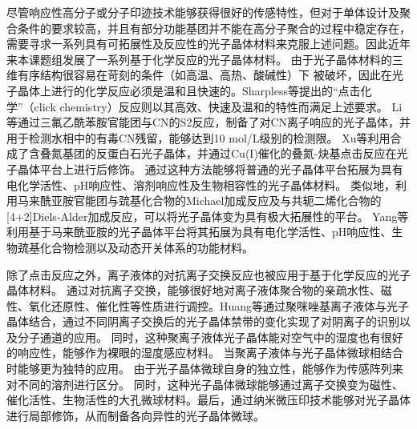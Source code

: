 尽管响应性高分子或分子印迹技术能够获得很好的传感特性，但对于单体设计及聚合条件的要求较高，并且有部分功能基团并不能在高分子聚合的过程中稳定存在，需要寻求一系列具有可拓展性及反应性的光子晶体材料来克服上述问题。因此近年来本课题组发展了一系列基于化学反应的光子晶体材料。
由于光子晶体材料的三维有序结构很容易在苛刻的条件（如高温、高热、酸碱性）下
被破坏，因此在光子晶体上进行的化学反应必须是温和且快速的。Sharpless等提出的“点击化学”（click chemistry）反应\cite{Kolb2001Click}则以其高效、快速及温和的特性而满足上述要求。
Li等通过三氟乙酰苯胺官能团与CN\text{$^-$}的S2反应，制备了对CN\text{$^-$}离子响应的光子晶体，并用于检测水相中的有毒CN\text{$^-$}残留，能够达到10 mol/L级别的检测限\cite{Li2012Reactive}。
Xu等利用合成了含叠氮基团的反蛋白石光子晶体，并通过Cu(I)催化的叠氮-炔基点击反应在光子晶体平台上进行后修饰\cite{Xu2012Clickable}。
通过这种方法能够将普通的光子晶体平台拓展为具有电化学活性、pH响应性、溶剂响应性及生物相容性的光子晶体材料。
类似地，利用马来酰亚胺官能团与巯基化合物的Michael加成反应及与共轭二烯化合物的[4+2]Diels-Alder加成反应，可以将光子晶体变为具有极大拓展性的平台。
Yang等利用基于马来酰亚胺的光子晶体平台将其拓展为具有电化学活性、pH响应性、生物巯基化合物检测以及动态开关体系的功能材料\cite{Yang2013MaleimideContaining}。

除了点击反应之外，离子液体的对抗离子交换反应也被应用于基于化学反应的光子晶体材料。
通过对抗离子交换，能够很好地对离子液体聚合物的亲疏水性、磁性、氧化还原性、催化性等性质进行调控。Huang等通过聚咪唑基离子液体与光子晶体结合，通过不同阴离子交换后的光子晶体禁带的变化实现了对阴离子的识别以及分子通道的应用\cite{Huang20103DOrdered}。
同时，这种聚离子液体光子晶体能对空气中的湿度也有很好的响应性，能够作为裸眼的湿度感应材料\cite{Huang2010Visual}。
当聚离子液体与光子晶体微球相结合时能够更为独特的应用\cite{Cui2014Inverse}。
由于光子晶体微球自身的独立性，能够作为传感阵列来对不同的溶剂进行区分。
同时，这种光子晶体微球能够通过离子交换变为磁性、催化活性、生物活性的大孔微球材料。最后，通过纳米微压印技术能够对光子晶体进行局部修饰，从而制备各向异性的光子晶体微球。

